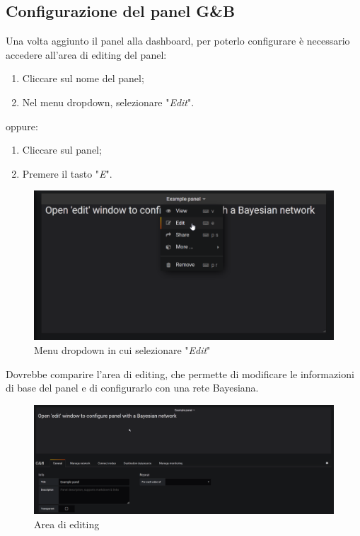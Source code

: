 \subsection{Configurazione del panel G\&B}
Una volta aggiunto il panel alla dashboard, per poterlo configurare è necessario accedere all'area di editing del panel:
\begin{enumerate}
	\item Cliccare sul nome del panel;
	\item Nel menu dropdown, selezionare "\textit{Edit}".
\end{enumerate}
oppure:
\begin{enumerate}
	\item Cliccare sul panel;
	\item Premere il tasto "\textit{E}".
\end{enumerate}
\begin{figure} [H]
	\centering
	\includegraphics[scale=0.55]{Img/editmode} 
	\caption{Menu dropdown in cui selezionare "\textit{Edit}"} \label{} 
\end{figure} 
Dovrebbe comparire l'area di editing, che permette di modificare le informazioni di base del panel e di configurarlo con una rete Bayesiana.
\begin{figure} [H]
	\centering
	\includegraphics[scale=0.4]{Img/editview} 
	\caption{Area di editing} \label{} 
\end{figure} 
